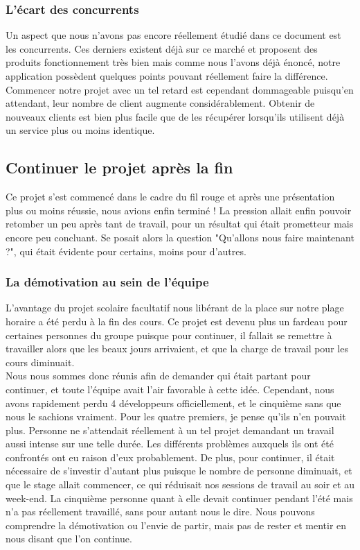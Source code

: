 \documentclass{article}
\begin{document}
\subsubsection{L'écart des concurrents}
		Un aspect que nous n'avons pas encore réellement étudié dans ce document est les concurrents. Ces derniers existent déjà sur ce marché et proposent des produits fonctionnement très bien mais comme nous l'avons déjà énoncé, notre application possèdent quelques points pouvant réellement faire la différence.\\
		
		Commencer notre projet avec un tel retard est cependant dommageable puisqu'en attendant, leur nombre de client augmente considérablement. Obtenir de nouveaux clients est bien plus facile que de les récupérer lorsqu'ils utilisent déjà un service plus ou moins identique.
\subsection{Continuer le projet après la fin}
		Ce projet s'est commencé dans le cadre du fil rouge et après une présentation plus ou moins réussie, nous avions enfin terminé ! La pression allait enfin pouvoir retomber un peu après tant de travail, pour un résultat qui était prometteur mais encore peu concluant. Se posait alors la question "Qu'allons nous faire maintenant ?", qui était évidente pour certains, moins pour d'autres.
\subsubsection{La démotivation au sein de l'équipe}
		L'avantage du projet scolaire facultatif nous libérant de la place sur notre plage horaire a été perdu à la fin des cours. Ce projet est devenu plus un fardeau pour certaines personnes du groupe puisque pour continuer, il fallait se remettre à travailler alors que les beaux jours arrivaient, et que la charge de travail pour les cours diminuait. \\
		
		Nous nous sommes donc réunis afin de demander qui était partant pour continuer, et toute l'équipe avait l'air favorable à cette idée. Cependant, nous avons rapidement perdu 4 développeurs officiellement, et le cinquième sans que nous le sachions vraiment. Pour les quatre premiers, je pense qu'ils n'en pouvait plus. Personne ne s'attendait réellement à un tel projet demandant un travail aussi intense sur une telle durée. Les différents problèmes auxquels ils ont été confrontés ont eu raison d'eux probablement. De plus, pour continuer, il était nécessaire de s'investir d'autant plus puisque le nombre de personne diminuait, et que le stage allait commencer, ce qui réduisait nos sessions de travail au soir et au week-end. La cinquième personne quant à elle devait continuer pendant l'été mais n'a pas réellement travaillé, sans pour autant nous le dire. Nous pouvons comprendre la démotivation ou l'envie de partir, mais pas de rester et mentir en nous disant que l'on continue. \\
		
\end{document}
